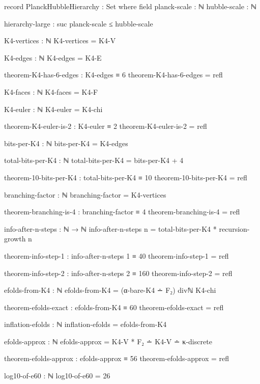\documentclass[11pt,a4paper]{book}
\begin{document}
\begin{code}
record PlanckHubbleHierarchy : Set where
  field
    planck-scale : ℕ
    hubble-scale : ℕ
    
    hierarchy-large : suc planck-scale ≤ hubble-scale
    
K4-vertices : ℕ
K4-vertices = K4-V

K4-edges : ℕ
K4-edges = K4-E

theorem-K4-has-6-edges : K4-edges ≡ 6
theorem-K4-has-6-edges = refl

K4-faces : ℕ
K4-faces = K4-F

K4-euler : ℕ
K4-euler = K4-chi

theorem-K4-euler-is-2 : K4-euler ≡ 2
theorem-K4-euler-is-2 = refl

bits-per-K4 : ℕ
bits-per-K4 = K4-edges

total-bits-per-K4 : ℕ
total-bits-per-K4 = bits-per-K4 + 4

theorem-10-bits-per-K4 : total-bits-per-K4 ≡ 10
theorem-10-bits-per-K4 = refl

branching-factor : ℕ
branching-factor = K4-vertices

theorem-branching-is-4 : branching-factor ≡ 4
theorem-branching-is-4 = refl

info-after-n-steps : ℕ → ℕ
info-after-n-steps n = total-bits-per-K4 * recursion-growth n

theorem-info-step-1 : info-after-n-steps 1 ≡ 40
theorem-info-step-1 = refl

theorem-info-step-2 : info-after-n-steps 2 ≡ 160
theorem-info-step-2 = refl

efolds-from-K4 : ℕ
efolds-from-K4 = (α-bare-K4 ∸ F₂) divℕ K4-chi

theorem-efolds-exact : efolds-from-K4 ≡ 60
theorem-efolds-exact = refl

inflation-efolds : ℕ
inflation-efolds = efolds-from-K4

efolds-approx : ℕ
efolds-approx = K4-V * F₂ ∸ K4-V ∸ κ-discrete

theorem-efolds-approx : efolds-approx ≡ 56
theorem-efolds-approx = refl

log10-of-e60 : ℕ
log10-of-e60 = 26
\end{code}
\end{document}
